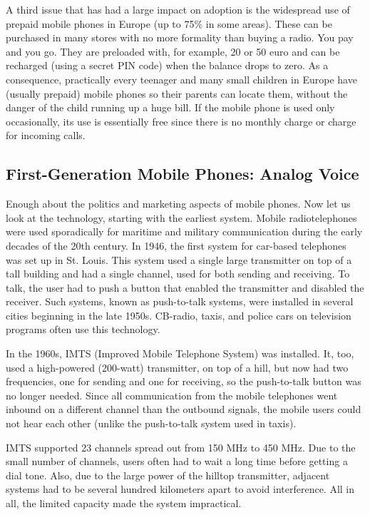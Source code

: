 \documentclass[b5paper,11pt]{memoir}
\begin{document}
A third issue that has had a large impact on adoption is the widespread
use of prepaid mobile phones in Europe (up to 75\% in some areas). These
can be purchased in many stores with no more formality than buying a
radio. You pay and you go. They are preloaded with, for example, 20 or
50 euro and can be recharged (using a secret PIN code) when the balance
drops to zero. As a consequence, practically every teenager and many
small children in Europe have (usually prepaid) mobile phones so their
parents can locate them, without the danger of the child running up a
huge bill. If the mobile phone is used only occasionally, its use is
essentially free since there is no monthly charge or charge for incoming
calls.

\protect\hypertarget{0130661023_ch02lev1sec6.htmlux5cux23ch02lev2sec22}{}{}

\subsection{First-Generation Mobile Phones: Analog Voice}

Enough about the politics and marketing aspects of mobile phones. Now
let us look at the technology, starting with the earliest system. Mobile
radiotelephones were used sporadically for maritime and military
communication during the early decades of the 20th century. In 1946, the
first system for car-based telephones was set up in St. Louis. This
system used a single large transmitter on top of a tall building and had
a single channel, used for both sending and receiving. To talk, the user
had to push a button that enabled the transmitter and disabled the
receiver. Such systems, known as {push-to-talk systems}, were installed
in several cities beginning in the late 1950s. CB-radio, taxis, and
police cars on television programs often use this technology.

In the 1960s, {IMTS} ({Improved Mobile Telephone System}) was installed.
It, too, used a high-powered (200-watt) transmitter, on top of a hill,
but now had two frequencies, one for sending and one for receiving, so
the push-to-talk button was no longer needed. Since all communication
from the mobile telephones went inbound on a different channel than the
outbound signals, the mobile users could not hear each other (unlike the
push-to-talk system used in taxis).

IMTS supported 23 channels spread out from 150 MHz to 450 MHz. Due to
the small number of channels, users often had to wait a long time before
getting a dial tone. Also, due to the large power of the hilltop
transmitter, adjacent systems had to be several hundred kilometers apart
to avoid interference. All in all, the limited capacity made the system
impractical.
\end{document}

